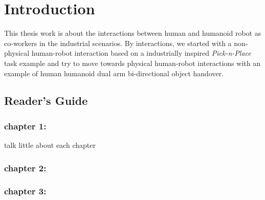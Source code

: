 \documentclass[a4paper, 12pt, oneside]{Thesis}  %
\begin{document}
\mainmatter	  %
\pagestyle{fancy}  %



\chapter{Introduction}

This thesis work is about the interactions between human and humanoid robot as co-workers in the industrial scenarios. By interactions, we started with a non-physical human-robot interaction based on a industrially inspired \textit{Pick-n-Place} task example and try to move towards physical human-robot interactions with an example of human humanoid dual arm bi-directional object handover.

\section{Reader's Guide}

\subsection{chapter 1:}
talk little about each chapter

\subsection{chapter 2:}

\subsection{chapter 3:}

\end{document}
